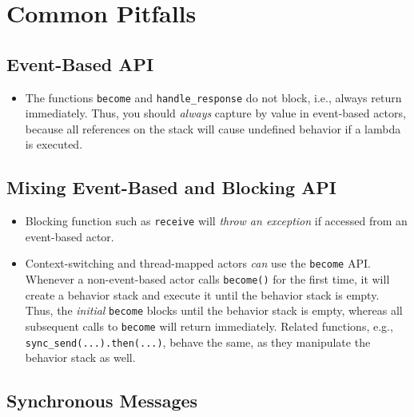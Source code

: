 \section{Common Pitfalls}
\label{Sec::Pitfalls}

\subsection{Event-Based API}

\begin{itemize}
\item The functions \lstinline^become^ and \lstinline^handle_response^ do not block, i.e., always return immediately.
Thus, you should \textit{always} capture by value in event-based actors, because all references on the stack will cause undefined behavior if a lambda is executed.
\end{itemize}

\subsection{Mixing Event-Based and Blocking API}

\begin{itemize}
\item Blocking \libcppa function such as \lstinline^receive^ will \emph{throw an exception} if accessed from an event-based actor.

\item Context-switching and thread-mapped actors \emph{can} use the \lstinline^become^ API.
Whenever a non-event-based actor calls \lstinline^become()^ for the first time, it will create a behavior stack and execute it until the behavior stack is empty.
Thus, the \textit{initial} \lstinline^become^ blocks until the behavior stack is empty, whereas all subsequent calls to \lstinline^become^ will return immediately.
Related functions, e.g., \lstinline^sync_send(...).then(...)^, behave the same, as they manipulate the behavior stack as well.
\end{itemize}

\subsection{Synchronous Messages}

